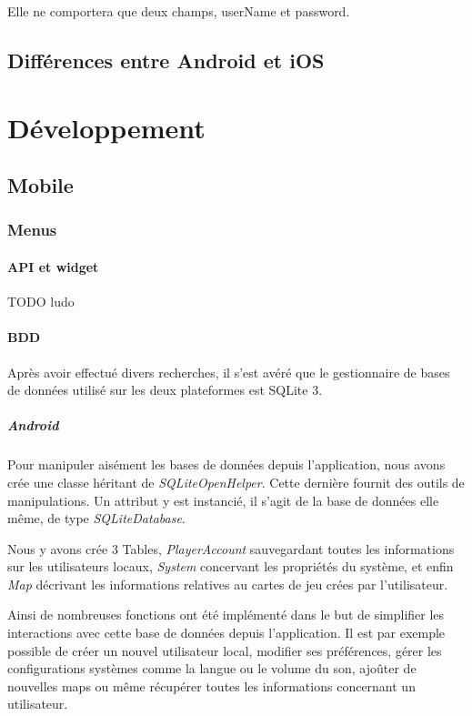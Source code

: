 \documentclass[]{report}
\begin{document}
			Elle ne comportera que deux champs, userName et password.
						
	\section{Différences entre Android et iOS}
	


\chapter{Développement}
	\section{Mobile}
		\subsection{Menus}
			\subsubsection{API et widget}
			TODO ludo
		
		
			\subsubsection{BDD}
			Après avoir effectué divers recherches, il s'est avéré que le gestionnaire
			de bases de données utilisé sur les deux plateformes est SQLite 3. 
			
			\paragraph{Android\\}
			
			Pour manipuler aisément les bases de données depuis l'application,
			nous avons crée une classe héritant de \textit{SQLiteOpenHelper}. Cette
			dernière fournit des outils de manipulations. Un attribut y est
			instancié, il s'agit de la base de données elle même, de type
			\textit{SQLiteDatabase}.
			
			Nous y avons crée 3 Tables, \textit{PlayerAccount} sauvegardant toutes les
			informations sur les utilisateurs locaux, \textit{System} concervant les
			propriétés du système, et enfin \textit{Map} décrivant les informations
			relatives au cartes de jeu crées par l'utilisateur.
			
			Ainsi de nombreuses	fonctions ont été implémenté dans le but de simplifier les interactions
			avec cette base de données depuis l'application. Il est par exemple possible de créer un nouvel 
			utilisateur local, modifier ses préférences, gérer les configurations systèmes comme la langue ou le volume
			du son, ajoûter de nouvelles maps ou même récupérer toutes les informations
			concernant un utilisateur.\\
			
\end{document}
